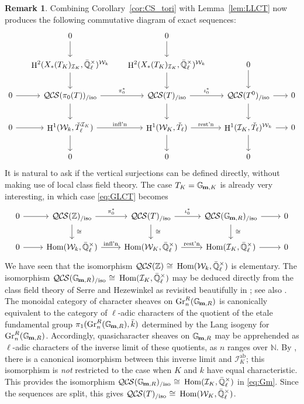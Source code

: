 \documentclass[10pt]{amsart}
\theoremstyle{plain}
\theoremstyle{definition}
\newtheorem{remark}[theorem]{Remark}
\newcommand{\ZZ}{{\mathbb{Z}}}
\newcommand{\NN}{{\mathbb{N}}}
\newcommand{\EE}{\mathbb{\bar Q}_\ell}
\newcommand{\bFq}{\bar{k}}
\newcommand{\Fq}{k}
\newcommand{\EEx}{\EE^\times}
\newcommand{\Weil}[1]{\mathcal{W}_{#1}}
\newcommand{\Gm}[1]{\mathbb{G}_{\hskip-1pt\textbf{m},#1}}
\DeclareMathOperator{\Hom}{Hom}
\DeclareMathOperator{\Gr}{Gr}
\DeclareMathOperator{\Hh}{H}
\newcommand{\iso}{{\ \cong\ }}
\newcommand{\QCS}{{\mathcal{QC\hskip-0.8pt S}}}
\newcommand{\QCSiso}[1]{\QCS(#1)_{/\text{iso}}}
\begin{document}
\begin{remark}
Combining Corollary~\ref{cor:CS_tori} with Lemma~\ref{lem:LLCT} now produces the following commutative diagram of exact sequences:
\begin{equation}\label{eq:GLCT}
  \begin{tikzcd}[row sep=20, column sep=15]
{}  & 0 \arrow{d} & 0 \arrow{d} &  & \\ 
   & \Hh^2(X_*(T_K)_{\mathcal{I}_K},\EEx)^{\Weil{\Fq}}  \arrow{d} & \arrow{d} \Hh^2(X_*(T_K)_{\mathcal{I}_K},\EEx)^{\Weil{\Fq}} & 0 \arrow{d} & \\
    0 \rar & \QCSiso{\pi_0(T)} \arrow{r}{\pi_0^*} \arrow{d}
    & \QCSiso{T} \arrow{r}{\iota_0^*}  \arrow{d} & \QCSiso{T^0} \arrow{r} \arrow{d} & 0\\
   0 \arrow{r}  
 & \Hh^1(\Weil{\Fq}, \check{T}_\ell^{\mathcal{I}_K}) \arrow{r}{\text{infl'n}} \arrow{d}
 & \Hh^1(\Weil{K}, \check{T}_\ell) \arrow{r}{\text{rest'n}} \arrow{d}
 & \Hh^1(\mathcal{I}_K, \check{T}_\ell)^{\Weil{\Fq}} \arrow{r} \arrow{d}  
 & 0\\
 &  0  & 0 & 0 & 
  \end{tikzcd}
 \end{equation}
It is natural to ask if the vertical surjections can be defined directly, without making use of local class field theory.  
The case $T_K = \Gm{K}$ is already very interesting, in which case \eqref{eq:GLCT} becomes
\begin{equation}\label{eq:Gm}
\begin{tikzcd}
    0 \rar & \QCSiso{\ZZ} \arrow{r}{\pi_0^*} \arrow{d}{\iso}
    & \QCSiso{T} \arrow{r}{\iota_0^*}  \arrow{d}{\iso} & \QCSiso{\Gm{R}} \arrow{r} \arrow{d}{\iso} & 0\\
    0 \arrow{r}  
 & \Hom(\Weil{\Fq}, \EEx) \arrow{r}{\text{infl'n}}
 & \Hom(\Weil{K}, \EEx) \arrow{r}{\text{rest'n}} 
 & \Hom(\mathcal{I}_K, \EEx) \arrow{r}  
 & 0
\end{tikzcd}
\end{equation}
We have seen that the isomorphism $\QCS(\ZZ)\iso \Hom(\Weil{\Fq}, \EEx)$ is elementary. 
The isomorphism $\QCSiso{\Gm{R}}\iso \Hom(\mathcal{I}_K, \EEx)$ may be deduced directly from the class field theory of Serre and Hezewinkel as revisited beautifully in \cite{suzuki-yoshida:12a}; see also \cite{Suzuki:Neron}.
The monoidal category of character sheaves on $\Gr^R_n(\Gm{R})$ is canonically equivalent to the category of $\ell$-adic characters of the quotient of the etale fundamental group $\pi_1(\Gr^R_n(\Gm{R}),\bFq)$ determined by the Lang isogeny for $\Gr^R_n(\Gm{R})$.
Accordingly, quasicharacter sheaves on $\Gm{R}$ may be apprehended as $\ell$-adic characters of
the inverse limit of these quotients, as $n$ ranges over $\NN$.
By \cite{serre:isogenies}, there is a canonical isomorphism between this inverse limit and $\mathcal{I}_K^\text{ab}$;
this isomorphism is {\it not} restricted to the case when $K$ and $\Fq$ have equal characteristic.
This provides the isomorphism $\QCSiso{\Gm{R}}\iso \Hom(\mathcal{I}_K, \EEx)$ in \eqref{eq:Gm}. 
Since the sequences are split, this gives $\QCSiso{T}\iso \Hom(\Weil{K}, \EEx)$.
\end{remark}
\end{document}
